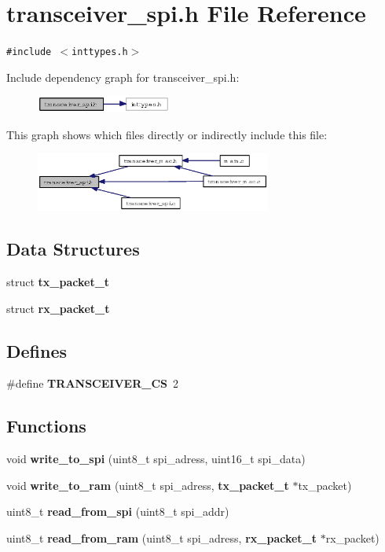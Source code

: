 \section{transceiver\_\-spi.h File Reference}
\label{transceiver__spi_8h}
{\tt \#include $<$inttypes.h$>$}\par


Include dependency graph for transceiver\_\-spi.h:\begin{figure}[H]
\begin{center}
\leavevmode
\includegraphics[width=126pt]{transceiver__spi_8h__incl}
\end{center}
\end{figure}


This graph shows which files directly or indirectly include this file:\begin{figure}[H]
\begin{center}
\leavevmode
\includegraphics[width=220pt]{transceiver__spi_8h__dep__incl}
\end{center}
\end{figure}
\subsection*{Data Structures}
\begin{CompactItemize}
\item 
struct {\bf tx\_\-packet\_\-t}
\item 
struct {\bf rx\_\-packet\_\-t}
\end{CompactItemize}
\subsection*{Defines}
\begin{CompactItemize}
\item 
\#define {\bf TRANSCEIVER\_\-CS}~2
\end{CompactItemize}
\subsection*{Functions}
\begin{CompactItemize}
\item 
void {\bf write\_\-to\_\-spi} (uint8\_\-t spi\_\-adress, uint16\_\-t spi\_\-data)
\item 
void {\bf write\_\-to\_\-ram} (uint8\_\-t spi\_\-adress, {\bf tx\_\-packet\_\-t} $\ast$tx\_\-packet)
\item 
uint8\_\-t {\bf read\_\-from\_\-spi} (uint8\_\-t spi\_\-addr)
\item 
uint8\_\-t {\bf read\_\-from\_\-ram} (uint8\_\-t spi\_\-adress, {\bf rx\_\-packet\_\-t} $\ast$rx\_\-packet)
\end{CompactItemize}
